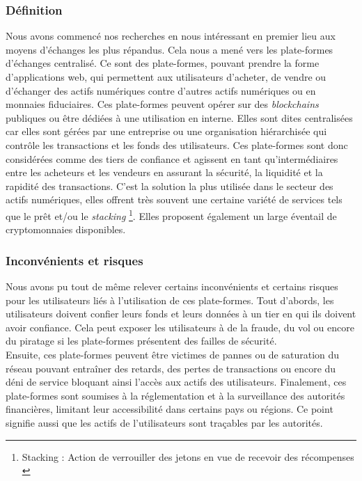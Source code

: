 \subsubsection{Définition}
Nous avons commencé nos recherches en nous intéressant en premier lieu aux moyens d'échanges les plus répandus. 
Cela nous a mené vers les plate-formes d'échanges centralisé. 
Ce sont des plate-formes, pouvant prendre la forme d'applications web, qui permettent aux utilisateurs d'acheter, de vendre ou d'échanger des \gls{actif}s numériques contre d'autres \gls{actif}s numériques ou en monnaies fiduciaires. 
Ces plate-formes peuvent opérer sur des \textit{\gls{blockchain}s} publiques ou être dédiées à une utilisation en interne. 
Elles sont dites centralisées car elles sont gérées par une entreprise ou une organisation hiérarchisée qui contrôle les transactions et les fonds des utilisateurs.
Ces plate-formes sont donc considérées comme des tiers de confiance et agissent en tant qu'intermédiaires entre les acheteurs et les vendeurs en assurant la sécurité, la liquidité et la rapidité des transactions.
C'est la solution la plus utilisée dans le secteur des \gls{actif}s numériques, elles offrent très souvent une certaine variété de services tels que le prêt et/ou le \textit{stacking} \footnote{Stacking : Action de verrouiller des jetons en vue de recevoir des récompenses \cite{defStack}}.
Elles proposent également un large éventail de cryptomonnaies disponibles.

\subsubsection{Inconvénients et risques}
Nous avons pu tout de même relever certains inconvénients et certains risques pour les utilisateurs liés à l'utilisation de ces plate-formes. 
Tout d'abords, les utilisateurs doivent confier leurs fonds et leurs données à un tier en qui ils doivent avoir confiance. 
Cela peut exposer les utilisateurs à de la fraude, du vol ou encore du piratage si les plate-formes présentent des failles de sécurité. \\
Ensuite, ces plate-formes peuvent être victimes de pannes ou de saturation du réseau pouvant entraîner des retards, des pertes de transactions ou encore du déni de service bloquant ainsi l'accès aux \gls{actif}s des utilisateurs. 
Finalement, ces plate-formes sont soumises à la réglementation et à la surveillance des autorités financières, limitant leur accessibilité dans certains pays ou régions. 
Ce point signifie aussi que les \gls{actif}s de l'utilisateurs sont traçables par les autorités. 


